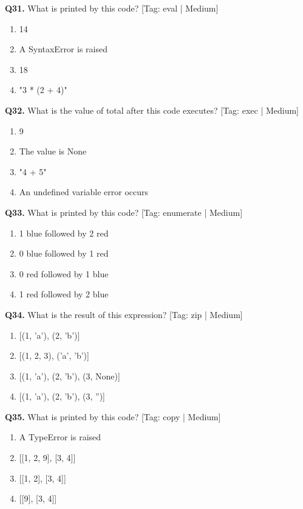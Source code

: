 \vspace{2mm}
\noindent\textbf{Q31.} What is printed by this code? \hfill [Tag: eval | Medium]
\begin{enumerate}[label=(\alph*),topsep=2pt,itemsep=1pt,partopsep=0pt,parsep=0pt]
    \item {14}
    \item {A SyntaxError is raised}
    \item {18}
    \item {"3 * (2 + 4)"}
\end{enumerate}
\vspace{2mm}
\noindent\textbf{Q32.} What is the value of total after this code executes? \hfill [Tag: exec | Medium]
\begin{enumerate}[label=(\alph*),topsep=2pt,itemsep=1pt,partopsep=0pt,parsep=0pt]
    \item {9}
    \item {The value is None}
    \item {"4 + 5"}
    \item {An undefined variable error occurs}
\end{enumerate}
\vspace{2mm}
\noindent\textbf{Q33.} What is printed by this code? \hfill [Tag: enumerate | Medium]
\begin{enumerate}[label=(\alph*),topsep=2pt,itemsep=1pt,partopsep=0pt,parsep=0pt]
    \item {1 blue followed by 2 red}
    \item {0 blue followed by 1 red}
    \item {0 red followed by 1 blue}
    \item {1 red followed by 2 blue}
\end{enumerate}
\vspace{2mm}
\noindent\textbf{Q34.} What is the result of this expression? \hfill [Tag: zip | Medium]
\begin{enumerate}[label=(\alph*),topsep=2pt,itemsep=1pt,partopsep=0pt,parsep=0pt]
    \item {[(1, 'a'), (2, 'b')]}
    \item {[(1, 2, 3), ('a', 'b')]}
    \item {[(1, 'a'), (2, 'b'), (3, None)]}
    \item {[(1, 'a'), (2, 'b'), (3, '')]}
\end{enumerate}
\vspace{2mm}
\noindent\textbf{Q35.} What is printed by this code? \hfill [Tag: copy | Medium]
\begin{enumerate}[label=(\alph*),topsep=2pt,itemsep=1pt,partopsep=0pt,parsep=0pt]
    \item {A TypeError is raised}
    \item {[[1, 2, 9], [3, 4]]}
    \item {[[1, 2], [3, 4]]}
    \item {[[9], [3, 4]]}
\end{enumerate}
